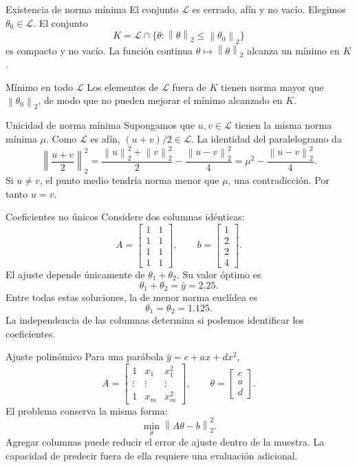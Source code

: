 \documentclass[aspectratio=169,12pt]{beamer}
\newcommand{\mat}[1]{\begin{bmatrix}#1\end{bmatrix}}
\newcommand{\norm}[1]{\left\lVert#1\right\rVert}
\begin{document}
\begin{frame}{Existencia de norma mínima}
El conjunto $\mathcal L$ es cerrado, afín y no vacío. Elegimos $\theta_0\in\mathcal L$.
El conjunto
\[
K=\mathcal L\cap\{\theta:\norm{\theta}_2\leq\norm{\theta_0}_2\}
\]
es compacto y no vacío. La función continua $\theta\mapsto\norm{\theta}_2$
alcanza un mínimo en $K$.
\begin{block}{Mínimo en todo $\mathcal L$}
Los elementos de $\mathcal L$ fuera de $K$ tienen norma mayor que
$\norm{\theta_0}_2$, de modo que no pueden mejorar el mínimo alcanzado en $K$.
\end{block}
\end{frame}

\begin{frame}{Unicidad de norma mínima}
Supongamos que $u,v\in\mathcal L$ tienen la misma norma mínima $\mu$.
Como $\mathcal L$ es afín, $(u+v)/2\in\mathcal L$.
La identidad del paralelogramo da
\[
\left\lVert\frac{u+v}{2}\right\rVert_2^2
=\frac{\norm{u}_2^2+\norm{v}_2^2}{2}
-\frac{\norm{u-v}_2^2}{4}
=\mu^2-\frac{\norm{u-v}_2^2}{4}.
\]
Si $u\neq v$, el punto medio tendría norma menor que $\mu$, una contradicción.
Por tanto $u=v$.
\end{frame}

\begin{frame}{Coeficientes no únicos}
Considere dos columnas idénticas:
\[
A=\mat{1&1\\1&1\\1&1\\1&1},\qquad b=\mat{1\\2\\2\\4}.
\]
El ajuste depende únicamente de $\theta_1+\theta_2$. Su valor óptimo es
\[
\theta_1+\theta_2=\bar y=2.25.
\]
Entre todas estas soluciones, la de menor norma euclídea es
\[
\theta_1=\theta_2=1.125.
\]
La independencia de las columnas determina si podemos identificar los coeficientes.
\end{frame}

\begin{frame}{Ajuste polinómico}
Para una parábola $\widehat y=c+ax+dx^2$,
\[
A=\mat{1&x_1&x_1^2\\\vdots&\vdots&\vdots\\1&x_m&x_m^2},
\qquad\theta=\mat{c\\a\\d}.
\]
El problema conserva la misma forma:
\[
\min_\theta\norm{A\theta-b}_2^2.
\]
Agregar columnas puede reducir el error de ajuste dentro de la muestra.
La capacidad de predecir fuera de ella requiere una evaluación adicional.
\end{frame}
\end{document}
